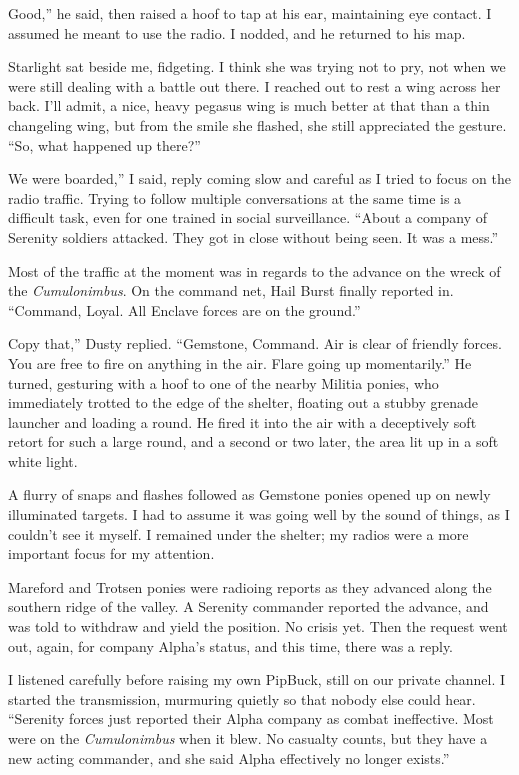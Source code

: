 \leavevmode{}Good,” he said, then raised a hoof to tap at his ear, maintaining eye contact. I assumed he meant to use the radio. I nodded, and he returned to his map.

Starlight sat beside me, fidgeting. I think she was trying not to pry, not when we were still dealing with a battle out there. I reached out to rest a wing across her back. I’ll admit, a nice, heavy pegasus wing is much better at that than a thin changeling wing, but from the smile she flashed, she still appreciated the gesture. “So, what happened up there?”

\leavevmode{}We were boarded,” I said, reply coming slow and careful as I tried to focus on the radio traffic. Trying to follow multiple conversations at the same time is a difficult task, even for one trained in social surveillance. “About a company of Serenity soldiers attacked. They got in close without being seen. It was a mess.”

Most of the traffic at the moment was in regards to the advance on the wreck of the \textit{Cumulonimbus}. On the command net, Hail Burst finally reported in. “Command, Loyal. All Enclave forces are on the ground.”

\leavevmode{}Copy that,” Dusty replied. “Gemstone, Command. Air is clear of friendly forces. You are free to fire on anything in the air. Flare going up momentarily.” He turned, gesturing with a hoof to one of the nearby Militia ponies, who immediately trotted to the edge of the shelter, floating out a stubby grenade launcher and loading a round. He fired it into the air with a deceptively soft retort for such a large round, and a second or two later, the area lit up in a soft white light.

A flurry of snaps and flashes followed as Gemstone ponies opened up on newly illuminated targets. I had to assume it was going well by the sound of things, as I couldn’t see it myself. I remained under the shelter; my radios were a more important focus for my attention.

Mareford and Trotsen ponies were radioing reports as they advanced along the southern ridge of the valley. A Serenity commander reported the advance, and was told to withdraw and yield the position. No crisis yet. Then the request went out, again, for company Alpha’s status, and this time, there was a reply.

I listened carefully before raising my own PipBuck, still on our private channel. I started the transmission, murmuring quietly so that nobody else could hear. “Serenity forces just reported their Alpha company as combat ineffective. Most were on the \textit{Cumulonimbus} when it blew. No casualty counts, but they have a new acting commander, and she said Alpha effectively no longer exists.”

